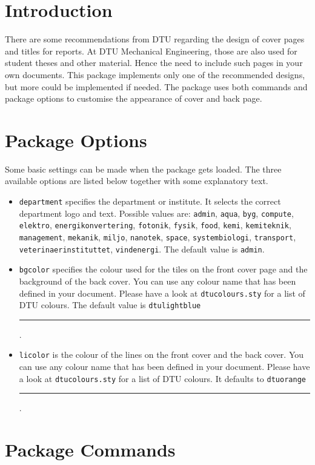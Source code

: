 \documentclass[b5paper]{article}
\begin{document}
\section{Introduction}

There are some recommendations from DTU regarding the design of cover pages and titles for reports. At DTU Mechanical Engineering, those are also used for 
student theses and other material. Hence the need to include such pages in your own documents. This package implements only one of the recommended designs, 
but more could be implemented if needed. The package uses both commands and package options to customise the appearance of cover and back page. 

\section{Package Options}
Some basic settings can be made when the package gets loaded. The three available options are listed below together with some explanatory text.
\begin{itemize}
\item \texttt{department}  specifies the department or institute. It selects the correct department logo and text. Possible values are: \verb|admin|, \verb|aqua|, \verb|byg|, \verb|compute|, \verb|elektro|, \verb|energikonvertering|, \verb|fotonik|, \verb|fysik|, \verb|food|, \verb|kemi|, \verb|kemiteknik|, \verb|management|, \verb|mekanik|, \verb|miljo|, \verb|nanotek|, \verb|space|, \verb|systembiologi|, \verb|transport|, \verb|veterinaerinstituttet|, \verb|vindenergi|. The default value is \verb|admin|.
\item \texttt{bgcolor} specifies the colour used for the tiles on the front cover page and the background of the back cover. You can use any colour name that has been defined in your document. Please have a look at \texttt{dtucolours.sty} for a list of DTU colours. The default value is \texttt{dtulightblue} \textcolor{dtulightblue}{\rule{10pt}{10pt}}.
\item \texttt{licolor} is the colour of the lines on the front cover and the back cover. You can use any colour name that has been defined in your document. Please have a look at \texttt{dtucolours.sty} for a list of DTU colours. It defaults to \texttt{dtuorange} \textcolor{dtuorange}{\rule{10pt}{10pt}}.
\end{itemize}

\section{Package Commands}
\end{document}
